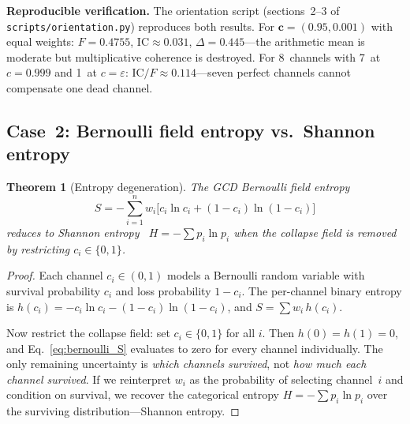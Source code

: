 \documentclass[
  aps,
  prd,
  twocolumn,
  superscriptaddress,
  nofootinbib,
  floatfix
]{revtex4-2}
\newtheorem{theorem}{Theorem}
\newcommand{\eps}{\varepsilon}
\newcommand{\beq}{\begin{equation}}
\newcommand{\eeq}{\end{equation}}
\newcommand{\tvec}{\mathbf{c}}
\newcommand{\IC}{\mathrm{IC}}
\begin{document}
\noindent\textbf{Reproducible verification.}
The orientation script (sections~2--3 of
\texttt{scripts/orientation.py}) reproduces both results.
For $\tvec = (0.95, 0.001)$ with equal weights:
$F = 0.4755$, $\IC \approx 0.031$,
$\Delta = 0.445$---the arithmetic mean is moderate but
multiplicative coherence is destroyed.  For 8~channels with
7~at $c = 0.999$ and 1~at $c = \eps$:
$\IC/F \approx 0.114$---seven perfect channels cannot
compensate one dead channel.

\subsection{Case~2: Bernoulli field entropy vs.\ Shannon entropy}

\begin{theorem}[Entropy degeneration]
\label{thm:entropy}
The GCD Bernoulli field entropy
\beq
  S = -\!\sum_{i=1}^n w_i\bigl[
    c_i \ln c_i + (1{-}c_i)\ln(1{-}c_i)\bigr]
  \label{eq:bernoulli_S}
\eeq
reduces to Shannon entropy~\cite{shannon1948}
$H = -\sum p_i \ln p_i$ when the collapse field is removed by
restricting $c_i \in \{0, 1\}$.
\end{theorem}

\begin{proof}
Each channel $c_i \in (0,1)$ models a Bernoulli random
variable with survival probability $c_i$ and loss
probability $1 - c_i$.  The per-channel binary entropy is
$h(c_i) = -c_i \ln c_i - (1{-}c_i)\ln(1{-}c_i)$, and
$S = \sum w_i\, h(c_i)$.

Now restrict the collapse field: set $c_i \in \{0, 1\}$ for
all $i$.  Then $h(0) = h(1) = 0$, and Eq.~\ref{eq:bernoulli_S}
evaluates to zero for every channel individually.  The only
remaining uncertainty is \emph{which channels survived}, not
\emph{how much each channel survived}.  If we reinterpret
$w_i$ as the probability of selecting channel~$i$ and condition
on survival, we recover the categorical entropy
$H = -\sum p_i \ln p_i$ over the surviving
distribution---Shannon entropy.
\end{proof}
\end{document}

